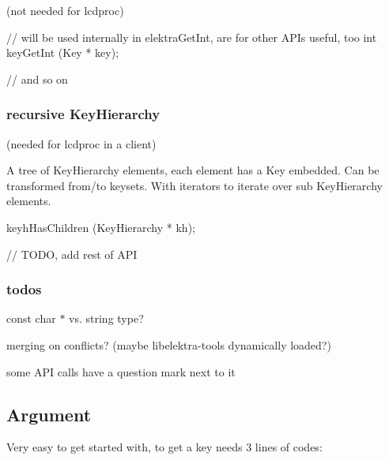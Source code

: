 (not needed for lcdproc)


\begin{DoxyCode}
\textcolor{comment}{// will be used internally in elektraGetInt, are for other APIs useful, too}
\textcolor{keywordtype}{int} keyGetInt (Key * key);

\textcolor{comment}{// and so on}
\end{DoxyCode}


\subsubsection*{recursive Key\+Hierarchy}

(needed for lcdproc in a client)

A tree of {\ttfamily Key\+Hierarchy} elements, each element has a {\ttfamily Key} embedded. Can be transformed from/to keysets. With iterators to iterate over sub {\ttfamily Key\+Hierarchy} elements.


\begin{DoxyCode}
keyhHasChildren (KeyHierarchy * kh);

\textcolor{comment}{// TODO, add rest of API}
\end{DoxyCode}


\subsubsection*{todos}


\begin{DoxyItemize}
\item const char $\ast$ vs. string type?
\item merging on conflicts? (maybe libelektra-\/tools dynamically loaded?)
\item some A\+PI calls have a question mark next to it
\end{DoxyItemize}

\subsection*{Argument}


\begin{DoxyEnumerate}
\item Very easy to get started with, to get a key needs 3 lines of codes\+:
\end{DoxyEnumerate}





